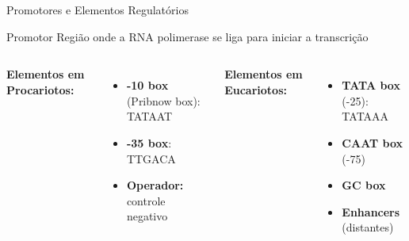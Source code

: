 \begin{frame}{Promotores e Elementos Regulatórios}
\begin{block}{Promotor}
Região onde a RNA polimerase se liga para iniciar a transcrição
\end{block}

\begin{columns}
\textbf{Elementos em Procariotos:}
\begin{itemize}
    \item \textbf{-10 box} (Pribnow box):\\
    TATAAT
    \item \textbf{-35 box}:\\
    TTGACA
    \item \textbf{Operador:} controle negativo
\end{itemize}

\textbf{Elementos em Eucariotos:}
\begin{itemize}
    \item \textbf{TATA box} (-25):\\
    TATAAA
    \item \textbf{CAAT box} (-75)
    \item \textbf{GC box}
    \item \textbf{Enhancers} (distantes)
\end{itemize}
\end{columns}

\vspace{0.3cm}

\end{frame}

